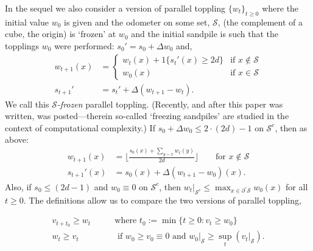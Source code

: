 \documentclass[12pt]{amsart}
\begin{document}
In the sequel we also consider a version of parallel toppling $\{w_t\}_{t \geq 0}$ where 
the initial value $w_0$ is given and the odometer on some set, $\mathcal{S}$, (the complement of a cube, the origin) is `frozen' at $w_0$ 
and the initial sandpile is such that the topplings $w_0$ were performed: $s_0' = s_0 + \Delta w_0$ and, 
\begin{equation} \label{eq:frozen_parallel_toppling}
\begin{aligned}
w_{t+1}(x) &=
\begin{cases}
w_{t}(x) + 1 \{ s_{t}'(x) \geq 2 d \}  &\mbox{if $x \not \in \mathcal{S}$} \\
w_0(x)  &\mbox{if $x \in \mathcal{S}$}
\end{cases} \\
s_{t+1}' &= s_{t}' + \Delta (w_{t+1} - w_{t}).
\end{aligned} 
\end{equation}
We call this {\it $\mathcal{S}$-frozen} parallel toppling. (Recently, and after this paper was written, \cite{goles2021freezing} was posted---therein so-called `freezing sandpiles' are studied in the context of computational complexity.) 
If $s_0 + \Delta w_0 \leq 2 \cdot (2 d)-1$ on $\mathcal{S}^c$, then as above:
\begin{equation} \label{eq:frozen_parallel_toppling_recurse}
\begin{aligned}
w_{t+1}(x) &=   \lfloor \frac{ s_0(x) + \sum_{y \sim x} w_{t}(y)}{2 d} \rfloor  \qquad \mbox{for $x \not \in \mathcal{S}$} \\
s_{t+1}'(x) &= s_0(x) + \Delta (w_{t+1} - w_{0})(x).
\end{aligned}
\end{equation}
Also, if $s_0 \leq (2 d-1)$ and $w_0 \equiv 0$ on $\mathcal{S}^c$, then $w_t |_{\mathcal{S}^c} \leq \max_{x \in \partial^{\circ} \mathcal{S}} w_0(x)$ for all $t \geq 0$.
The definitions allow us to compare the two versions of parallel toppling,

\begin{equation} \label{eq:odometer_wave_comp}
\begin{aligned}
v_{t + t_0} \geq w_t  \qquad &\mbox{where $t_0:=  \min\{ t \geq 0 : v_{t} \geq w_0 \}$} \\
w_t \geq v_t  \qquad &\mbox{ if $w_0 \geq v_0 \equiv 0$ and $w_0|_{\mathcal{S}} \geq \sup_{t} (v_t|_{\mathcal{S}})$}.
\end{aligned}
\end{equation}
\end{document}
